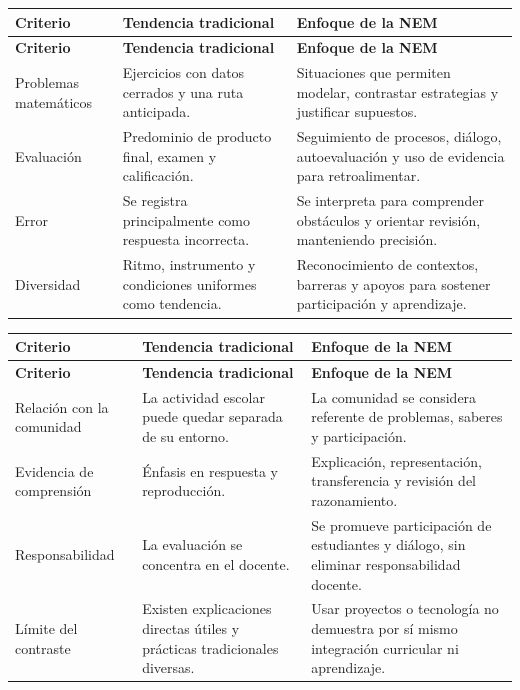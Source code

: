 \documentclass[spanish,letterpaper,oneside]{article}
\begin{document}
{\small{}\renewcommand{\arraystretch}{1.25}
\begin{longtable}{|>{\raggedright\arraybackslash}p{}|>{\raggedright\arraybackslash}p{}|>{\raggedright\arraybackslash}p{}|}\hline
\rowcolor{iiiepePale} \textbf{Criterio} & \textbf{Tendencia tradicional} & \textbf{Enfoque de la NEM} \\\hline
\endfirsthead
\hline
\rowcolor{iiiepePale} \textbf{Criterio} & \textbf{Tendencia tradicional} & \textbf{Enfoque de la NEM} \\\hline
\endhead
Problemas matemáticos & Ejercicios con datos cerrados y una ruta anticipada. & Situaciones que permiten modelar, contrastar estrategias y justificar supuestos. \\\hline
Evaluación & Predominio de producto final, examen y calificación. & Seguimiento de procesos, diálogo, autoevaluación y uso de evidencia para retroalimentar. \\\hline
Error & Se registra principalmente como respuesta incorrecta. & Se interpreta para comprender obstáculos y orientar revisión, manteniendo precisión. \\\hline
Diversidad & Ritmo, instrumento y condiciones uniformes como tendencia. & Reconocimiento de contextos, barreras y apoyos para sostener participación y aprendizaje. \\\hline
\end{longtable}}



{\small{}\renewcommand{\arraystretch}{1.25}
\begin{longtable}{|>{\raggedright\arraybackslash}p{}|>{\raggedright\arraybackslash}p{}|>{\raggedright\arraybackslash}p{}|}\hline
\rowcolor{iiiepePale} \textbf{Criterio} & \textbf{Tendencia tradicional} & \textbf{Enfoque de la NEM} \\\hline
\endfirsthead
\hline
\rowcolor{iiiepePale} \textbf{Criterio} & \textbf{Tendencia tradicional} & \textbf{Enfoque de la NEM} \\\hline
\endhead
Relación con la comunidad & La actividad escolar puede quedar separada de su entorno. & La comunidad se considera referente de problemas, saberes y participación. \\\hline
Evidencia de comprensión & Énfasis en respuesta y reproducción. & Explicación, representación, transferencia y revisión del razonamiento. \\\hline
Responsabilidad & La evaluación se concentra en el docente. & Se promueve participación de estudiantes y diálogo, sin eliminar responsabilidad docente. \\\hline
Límite del contraste & Existen explicaciones directas útiles y prácticas tradicionales diversas. & Usar proyectos o tecnología no demuestra por sí mismo integración curricular ni aprendizaje. \\\hline
\end{longtable}}
\end{document}
